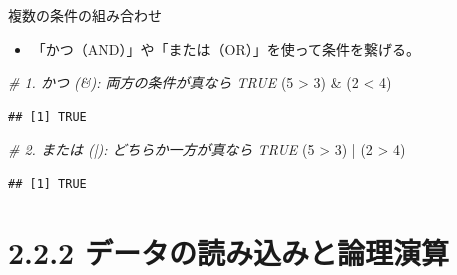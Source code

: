\documentclass[
  ignorenonframetext,
]{beamer}
\newenvironment{Shaded}{\begin{snugshade}}{\end{snugshade}}
\newcommand{\CommentTok}[1]{\textcolor[rgb]{0.56,0.35,0.01}{\textit{#1}}}
\newcommand{\DecValTok}[1]{\textcolor[rgb]{0.00,0.00,0.81}{#1}}
\newcommand{\NormalTok}[1]{#1}
\newcommand{\SpecialCharTok}[1]{\textcolor[rgb]{0.00,0.00,0.00}{#1}}
\providecommand{\tightlist}{%
  \setlength{\itemsep}{0pt}\setlength{\parskip}{0pt}}
\begin{document}
\begin{frame}[fragile]{複数の条件の組み合わせ}
\protect\hypertarget{ux8907ux6570ux306eux6761ux4ef6ux306eux7d44ux307fux5408ux308fux305b}{}
\begin{itemize}
\tightlist
\item
  「かつ（AND）」や「または（OR）」を使って条件を繋げる。
\end{itemize}

\scriptsize

\begin{Shaded}
\begin{Highlighting}[]
\CommentTok{\# 1. かつ (\&): 両方の条件が真なら TRUE}
\NormalTok{(}\DecValTok{5} \SpecialCharTok{\textgreater{}} \DecValTok{3}\NormalTok{) }\SpecialCharTok{\&}\NormalTok{ (}\DecValTok{2} \SpecialCharTok{\textless{}} \DecValTok{4}\NormalTok{)}
\end{Highlighting}
\end{Shaded}

\begin{verbatim}
## [1] TRUE
\end{verbatim}

\begin{Shaded}
\begin{Highlighting}[]
\CommentTok{\# 2. または (|): どちらか一方が真なら TRUE}
\NormalTok{(}\DecValTok{5} \SpecialCharTok{\textgreater{}} \DecValTok{3}\NormalTok{) }\SpecialCharTok{|}\NormalTok{ (}\DecValTok{2} \SpecialCharTok{\textgreater{}} \DecValTok{4}\NormalTok{)}
\end{Highlighting}
\end{Shaded}

\begin{verbatim}
## [1] TRUE
\end{verbatim}

\normalsize
\end{frame}

\hypertarget{ux30c7ux30fcux30bfux306eux8aadux307fux8fbcux307fux3068ux8ad6ux7406ux6f14ux7b97}{%
\section{2.2.2
データの読み込みと論理演算}\label{ux30c7ux30fcux30bfux306eux8aadux307fux8fbcux307fux3068ux8ad6ux7406ux6f14ux7b97}}
\end{document}
